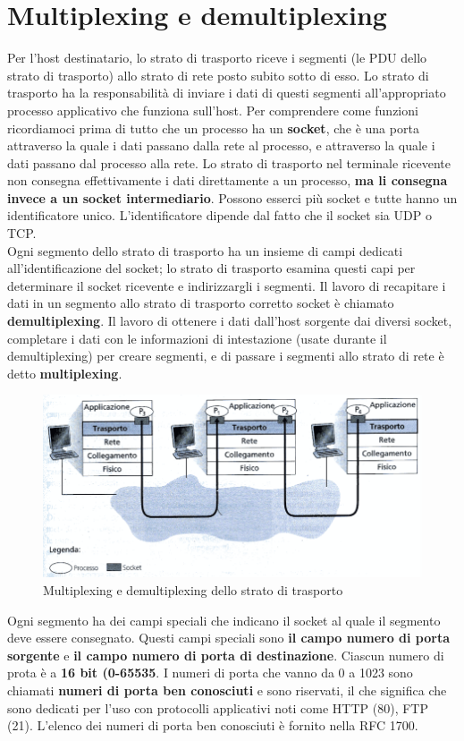 \documentclass[11pt,a4paper]{book}
\begin{document}
\section{Multiplexing e demultiplexing}
Per l'host destinatario, lo strato di trasporto riceve i segmenti (le PDU dello strato di trasporto) allo strato di rete posto subito sotto di esso. Lo strato di trasporto ha la responsabilità di inviare i dati di questi segmenti all'appropriato processo applicativo che funziona sull'host.
Per comprendere come funzioni ricordiamoci prima di tutto che un processo ha un \textbf{socket}, che è una porta attraverso la quale i dati passano dalla rete al processo, e attraverso la quale i dati passano dal processo alla rete. Lo strato di trasporto nel terminale ricevente non consegna effettivamente i dati direttamente a un processo, \textbf{ma li consegna invece a un socket intermediario}. Possono esserci più socket e tutte hanno un identificatore unico. L'identificatore dipende dal fatto che il socket sia UDP o TCP.\\
Ogni segmento dello strato di trasporto ha un insieme di campi dedicati all'identificazione del socket; lo strato di trasporto esamina questi capi per determinare il socket ricevente e indirizzargli i segmenti.
Il lavoro di recapitare i dati in un segmento allo strato di trasporto corretto socket è chiamato \textbf{demultiplexing}. Il lavoro di ottenere i dati dall'host sorgente dai diversi socket, completare i dati con le informazioni di intestazione (usate durante il demultiplexing) per creare segmenti, e di passare i segmenti allo strato di rete è detto \textbf{multiplexing}.
\begin{figure}
	\includegraphics[scale=0.6]{img/010.png}
	\caption{Multiplexing e demultiplexing dello strato di trasporto}
\end{figure}
Ogni segmento ha dei campi speciali che indicano il socket al quale il segmento deve essere consegnato. Questi campi speciali sono \textbf{il campo numero di porta sorgente}	e \textbf{il campo numero di porta di destinazione}. Ciascun numero di prota è a \textbf{16 bit (0-65535}. I numeri di porta che vanno da 0 a 1023 sono chiamati \textbf{numeri di porta ben conosciuti} e sono riservati, il che significa che sono dedicati per l'uso con protocolli applicativi noti come HTTP (80), FTP (21). L'elenco dei numeri di porta ben conosciuti è fornito nella RFC 1700.\\
\end{document}
